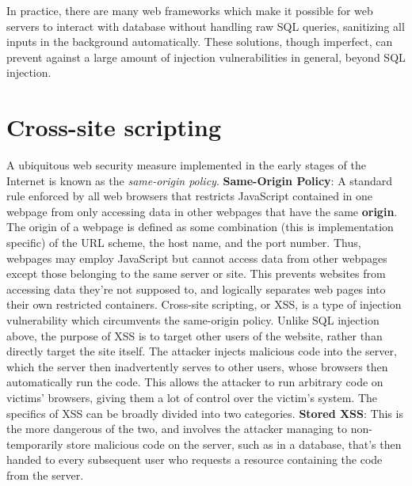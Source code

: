 \documentclass{article}
\begin{document}
\newline \newline
In practice, there are many web frameworks which make it possible for web servers to interact with database without handling raw SQL queries, sanitizing all inputs in the background automatically. These solutions, though imperfect, can prevent against a large amount of injection vulnerabilities in general, beyond SQL injection.

\section{Cross-site scripting}
A ubiquitous web security measure implemented in the early stages of the Internet is known as the \textit{same-origin policy}.
\newline \newline
\textbf{Same-Origin Policy}: A standard rule enforced by all web browsers that restricts JavaScript contained in one webpage from only accessing data in other webpages that have the same \textbf{origin}. The origin of a webpage is defined as some combination (this is implementation specific) of the URL scheme, the host name, and the port number. Thus, webpages may employ JavaScript but cannot access data from other webpages except those belonging to the same server or site. This prevents websites from accessing data they're not supposed to, and logically separates web pages into their own restricted containers.
\newline \newline
Cross-site scripting, or XSS, is a type of injection vulnerability which circumvents the same-origin policy. Unlike SQL injection above, the purpose of XSS is to target other users of the website, rather than directly target the site itself. The attacker injects malicious code into the server, which the server then inadvertently serves to other users, whose browsers then automatically run the code. This allows the attacker to run arbitrary code on victims' browsers, giving them a lot of control over the victim's system. The specifics of XSS can be broadly divided into two categories.
\newline \newline
\textbf{Stored XSS}: This is the more dangerous of the two, and involves the attacker managing to non-temporarily store malicious code on the server, such as in a database, that's then handed to every subsequent user who requests a resource containing the code from the server.
\newline
\end{document}
